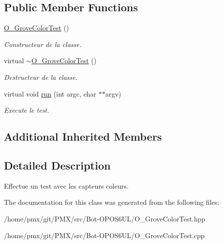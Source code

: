 \subsection*{Public Member Functions}
\begin{DoxyCompactItemize}
\item 
\mbox{\label{classO__GroveColorTest_ab4b3a1c219fea054ed29ffdde366103c}} 
\hyperlink{classO__GroveColorTest_ab4b3a1c219fea054ed29ffdde366103c}{O\+\_\+\+Grove\+Color\+Test} ()
\begin{DoxyCompactList}\small\item\em Constructeur de la classe. \end{DoxyCompactList}\item 
\mbox{\label{classO__GroveColorTest_af39c97991e410db7d54c468a5dfdfb7c}} 
virtual \hyperlink{classO__GroveColorTest_af39c97991e410db7d54c468a5dfdfb7c}{$\sim$\+O\+\_\+\+Grove\+Color\+Test} ()
\begin{DoxyCompactList}\small\item\em Destructeur de la classe. \end{DoxyCompactList}\item 
\mbox{\label{classO__GroveColorTest_a035d68d80a1be3d3140e3b9de6cba795}} 
virtual void \hyperlink{classO__GroveColorTest_a035d68d80a1be3d3140e3b9de6cba795}{run} (int argc, char $\ast$$\ast$argv)
\begin{DoxyCompactList}\small\item\em Execute le test. \end{DoxyCompactList}\end{DoxyCompactItemize}
\subsection*{Additional Inherited Members}


\subsection{Detailed Description}
Effectue un test avec les capteurs coleurs. 

The documentation for this class was generated from the following files\+:\begin{DoxyCompactItemize}
\item 
/home/pmx/git/\+P\+M\+X/src/\+Bot-\/\+O\+P\+O\+S6\+U\+L/O\+\_\+\+Grove\+Color\+Test.\+hpp\item 
/home/pmx/git/\+P\+M\+X/src/\+Bot-\/\+O\+P\+O\+S6\+U\+L/O\+\_\+\+Grove\+Color\+Test.\+cpp\end{DoxyCompactItemize}
